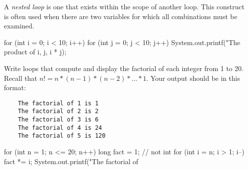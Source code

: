 \Q A \emph{nested loop} is one that exists within the scope of another loop.
This construct is often used when there are two variables for which all combinations must be examined.

\begin{javalst}
    for (int i = 0; i < 10; i++) {
        for (int j = 0; j < 10; j++) {
            System.out.printf("The product of %
                              i, j, i * j);
        }
    }
\end{javalst}

Write loops that compute and display the factorial of each integer from 1 to 20.
Recall that $n! = n * (n-1) * (n-2) * \ldots * 1$.
Your output should be in this format:

\begin{verbatim}
    The factorial of 1 is 1
    The factorial of 2 is 2
    The factorial of 3 is 6
    The factorial of 4 is 24
    The factorial of 5 is 120
\end{verbatim}

\vspace{-3ex}

\begin{answer}[10em]
\begin{javaans}
    for (int n = 1; n <= 20; n++) {
        long fact = 1;  // not int
        for (int i = n; i > 1; i--) {
            fact *= i;
        }
        System.out.printf("The factorial of %
    }
\end{javaans}
\end{answer}
